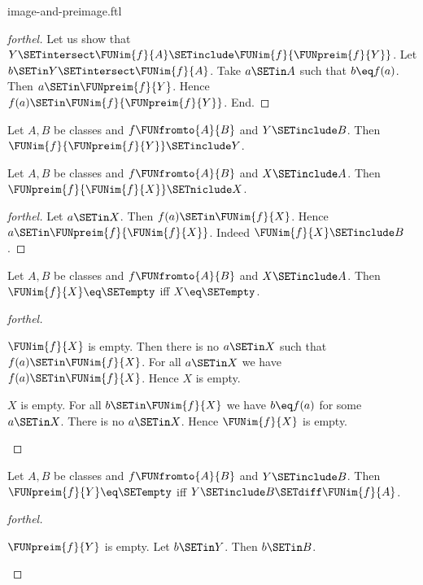 \documentclass{naproche-library}
\begin{document}
\begin{smodule}[title=Computation Laws for Images and Preimages]{image-and-preimage.ftl}
\begin{proof}[forthel]
  Let us show that $Y \SETintersect \FUNim{f}{A} \SETinclude \FUNim{f}{\FUNpreim{f}{Y}}$.
    Let $b \SETin Y \SETintersect \FUNim{f}{A}$.
    Take $a \SETin A$ such that $b \eq f(a)$.
    Then $a \SETin \FUNpreim{f}{Y}$.
    Hence $f(a) \SETin \FUNim{f}{\FUNpreim{f}{Y}}$.
  End.
\end{proof}

\begin{corollary}[forthel,id=FOUNDATIONS_07_5585105345052672]
  Let $A, B$ be classes and $f \FUNfromto{A}{B}$ and $Y \SETinclude B$.
  Then $\FUNim{f}{\FUNpreim{f}{Y}} \SETinclude Y$.
\end{corollary}

\begin{proposition}[forthel,id=FOUNDATIONS_07_4890896170483712]
  Let $A, B$ be classes and $f \FUNfromto{A}{B}$ and $X \SETinclude A$.
  Then $\FUNpreim{f}{\FUNim{f}{X}} \SETniclude X$.
\end{proposition}
\begin{proof}[forthel]
  Let $a \SETin X$.
  Then $f(a) \SETin \FUNim{f}{X}$.
  Hence $a \SETin \FUNpreim{f}{\FUNim{f}{X}}$.
  Indeed $\FUNim{f}{X} \SETinclude B$.
\end{proof}

\begin{proposition}[forthel,id=FOUNDATIONS_07_3318372355801088]
  Let $A, B$ be classes and $f \FUNfromto{A}{B}$ and $X \SETinclude A$.
  Then $\FUNim{f}{X} \eq \SETempty$ iff $X \eq \SETempty$.
\end{proposition}
\begin{proof}[forthel]
  \begin{case}{$\FUNim{f}{X}$ is empty.}
    Then there is no $a \SETin X$ such that $f(a) \SETin \FUNim{f}{X}$.
    For all $a \SETin X$ we have $f(a) \SETin \FUNim{f}{X}$.
    Hence $X$ is empty.
  \end{case}

  \begin{case}{$X$ is empty.}
    For all $b \SETin \FUNim{f}{X}$ we have $b \eq f(a)$ for some $a \SETin X$.
    There is no $a \SETin X$.
    Hence $\FUNim{f}{X}$ is empty.
  \end{case}
\end{proof}

\begin{proposition}[forthel,id=FOUNDATIONS_07_8597874786959360]
  Let $A, B$ be classes and $f \FUNfromto{A}{B}$ and $Y \SETinclude B$.
  Then $\FUNpreim{f}{Y} \eq \SETempty$ iff $Y \SETinclude B \SETdiff \FUNim{f}{A}$.
\end{proposition}
\begin{proof}[forthel]
  \begin{case}{$\FUNpreim{f}{Y}$ is empty.}
    Let $b \SETin Y$.
    Then $b \SETin B$.


\end{case}
\end{proof}
\end{smodule}
\end{document}
